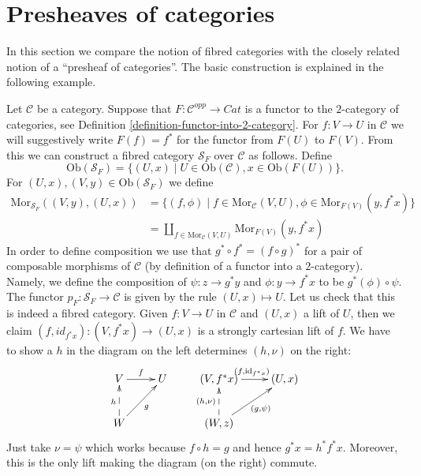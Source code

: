 \section{Presheaves of categories}
\label{section-presheaves-categories}

\noindent
In this section we compare the notion of fibred categories
with the closely related notion of a ``presheaf of categories''.
The basic construction is explained in the following example.

\begin{example}
\label{example-functor-categories}
Let $\mathcal{C}$ be a category.
Suppose that $F : \mathcal{C}^{opp} \to \textit{Cat}$ is a functor
to the $2$-category of categories, see
Definition \ref{definition-functor-into-2-category}.
For $f : V \to U$ in $\mathcal{C}$ we will
suggestively write $F(f) = f^\ast$ for the functor from $F(U)$ to $F(V)$.
From this we can construct a fibred category $\mathcal{S}_F$ over
$\mathcal{C}$ as follows. Define
$$
\text{Ob}(\mathcal{S}_F) =
\{(U, x) \mid U\in \text{Ob}(\mathcal{C}), x\in \text{Ob}(F(U))\}.
$$
For $(U, x), (V, y) \in \text{Ob}(\mathcal{S}_F)$ we define
\begin{align*}
\text{Mor}_{\mathcal{S}_F}((V, y), (U, x)) & =
\{ (f, \phi) \mid f \in \text{Mor}_\mathcal{C}(V, U),
\phi \in \text{Mor}_{F(V)}(y, f^\ast x)\} \\
& =
\coprod\nolimits_{f \in \text{Mor}_\mathcal{C}(V, U)}
\text{Mor}_{F(V)}(y, f^\ast x)
\end{align*}
In order to define composition we use that $g^\ast \circ f^\ast =
(f \circ g)^\ast$ for a pair of composable morphisms of $\mathcal{C}$
(by definition of a functor into a $2$-category).
Namely, we define the composition of $\psi : z \to g^\ast y$ and
$ \phi : y \to f^\ast x$ to be $ g^\ast(\phi) \circ \psi$. The functor
$p_F : \mathcal{S}_F \to \mathcal{C}$ is given by the rule
$(U, x) \mapsto U$.
Let us check that this is indeed a fibred category.
Given $f: V \to U$ in $\mathcal{C}$ and $(U, x)$ a lift of $U$, then
we claim $(f, id_{f^\ast x}): (V, {f^\ast x}) \to (U, x)$ is a 
strongly cartesian lift of $f$.
We have to show a $h$ in the diagram on the left
determines $(h, \nu)$ on the right:
$$
\xymatrix{
V \ar[r]^f &
U &
(V, f^*x) \ar[r]^{(f, \text{id}_{f^*x})} &
(U, x) \\
W \ar@{-->}[u]^h \ar[ru]_g & &
(W, z) \ar@{-->}[u]^{(h, \nu)} \ar[ru]_{(g, \psi)} &
}
$$
Just take $\nu = \psi$ which works because $f \circ h = g$
and hence $g^*x = h^*f^*x$. Moreover, this is the only lift
making the diagram (on the right) commute.
\end{example}

